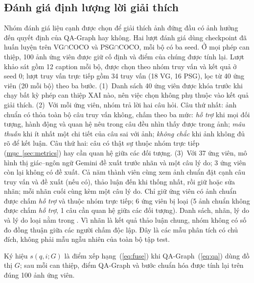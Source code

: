 \subsection{Đánh giá định lượng lời giải thích}\label{sec:r-xai}
Nhóm đánh giá liệu cạnh được chọn để giải thích ảnh đứng đầu có ảnh hưởng đến quyết định của QA-Graph hay không. Hai lượt đánh giá dùng checkpoint đã huấn luyện trên VG$\cap$COCO và PSG$\cap$COCO, mỗi bộ có ba seed. Ở mọi phép can thiệp, 100 ảnh ứng viên được giữ cố định và điểm của chúng được tính lại. Lượt khảo sát gồm 12 caption mỗi bộ, được chọn theo nhóm truy vấn và kết quả ở seed 0; lượt truy vấn trực tiếp gồm 34 truy vấn (18 VG, 16 PSG), lọc từ 40 ứng viên (20 mỗi bộ) theo ba bước.
(1)~Danh sách 40 ứng viên được khóa trước khi chạy bất kỳ phép can thiệp XAI nào, nên việc chọn không phụ thuộc vào kết quả giải thích.
(2)~Với mỗi ứng viên, nhóm trả lời hai câu hỏi. Câu thứ nhất: ảnh chuẩn có thỏa toàn bộ câu truy vấn không, chấm theo ba mức: \emph{hỗ trợ} khi mọi đối tượng, hành động và quan hệ nêu trong câu đều nhìn thấy được trong ảnh; \emph{mâu thuẫn} khi ít nhất một chi tiết của câu sai với ảnh; \emph{không chắc} khi ảnh không đủ rõ để kết luận. Câu thứ hai: câu có thật sự thuộc nhóm trực tiếp (\hyperref[sec:metrics]{mục~\ref*{sec:metrics}}) hay cần quan hệ giữa các đối tượng.
(3)~Với 37 ứng viên, mô hình thị giác--ngôn ngữ Gemini đề xuất trước nhãn và một câu lý do; 3 ứng viên còn lại không có đề xuất. Cả năm thành viên cùng xem ảnh chuẩn đặt cạnh câu truy vấn và đề xuất (nếu có), thảo luận đến khi thống nhất, rồi giữ hoặc sửa nhãn; mỗi nhãn cuối cùng kèm một câu lý do.
Chỉ giữ ứng viên có ảnh chuẩn được chấm \emph{hỗ trợ} và thuộc nhóm trực tiếp; 6 ứng viên bị loại (5 ảnh chuẩn không được chấm \emph{hỗ trợ}, 1 câu cần quan hệ giữa các đối tượng). Danh sách, nhãn, lý do và lý do loại nằm trong . Vì nhãn là kết quả thảo luận chung, nhóm không có số đo đồng thuận giữa các người chấm độc lập. Đây là các mẫu phân tích có chủ đích, không phải mẫu ngẫu nhiên của toàn bộ tập test.

Ký hiệu $s(q,i;G)$ là điểm xếp hạng~(\ref{eq:fuse}) khi QA-Graph~(\ref{eq:qa}) dùng đồ thị $G$; sau mỗi can thiệp, điểm QA-Graph và bước chuẩn hóa được tính lại trên đúng 100 ảnh ứng viên.

